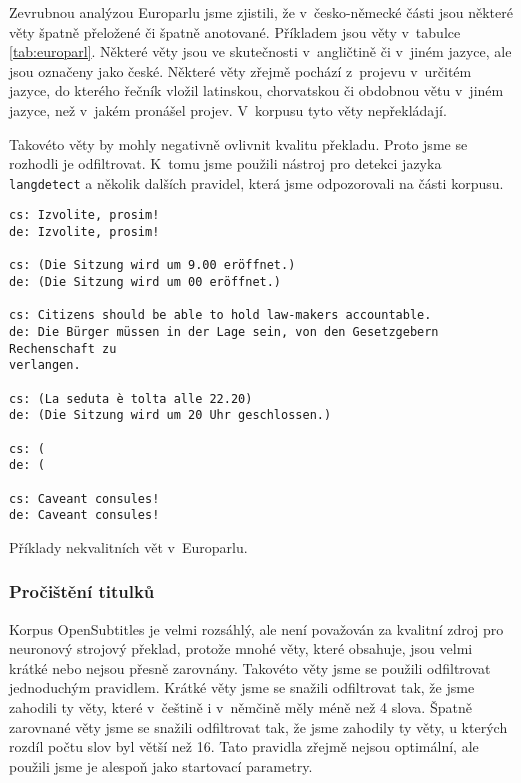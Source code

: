 \documentclass[a4]{article}
\begin{document}
Zevrubnou analýzou Europarlu jsme zjistili, že v~česko-německé části jsou některé
věty špatně přeložené či špatně anotované. Příkladem jsou věty v~tabulce
\ref{tab:europarl}. Některé věty jsou ve skutečnosti v~angličtině či v~jiném
jazyce, ale jsou označeny jako české. Některé věty zřejmě pochází
z~projevu v~určitém jazyce, do kterého řečník vložil latinskou, chorvatskou
či obdobnou větu v~jiném jazyce, než v~jakém pronášel projev. V~korpusu
tyto věty nepřekládají. 

Takovéto věty by mohly negativně ovlivnit kvalitu překladu. Proto jsme se
rozhodli je odfiltrovat. K~tomu jsme použili
nástroj pro detekci jazyka {\tt langdetect}\cite{langdetect} a několik
dalších pravidel, která jsme odpozorovali na části korpusu.

\begin{table}[ht]
\begin{verbatim}
cs: Izvolite, prosim!
de: Izvolite, prosim!

cs: (Die Sitzung wird um 9.00 eröffnet.)
de: (Die Sitzung wird um 00 eröffnet.)

cs: Citizens should be able to hold law-makers accountable.
de: Die Bürger müssen in der Lage sein, von den Gesetzgebern Rechenschaft zu
verlangen.

cs: (La seduta è tolta alle 22.20)
de: (Die Sitzung wird um 20 Uhr geschlossen.)

cs: (
de: (

cs: Caveant consules!
de: Caveant consules!
\end{verbatim}
\caption{Příklady nekvalitních vět v~Europarlu.}
\label{tab:europarl}
\end{table}

\subsubsection{Pročištění titulků}

Korpus OpenSubtitles je velmi rozsáhlý, ale není považován za kvalitní
zdroj pro neuronový strojový překlad, protože mnohé věty, které obsahuje,
jsou velmi krátké nebo nejsou přesně zarovnány. Takovéto věty jsme se
použili odfiltrovat jednoduchým pravidlem. Krátké věty jsme se snažili
odfiltrovat tak, že jsme zahodili ty věty, které v~češtině i v~němčině měly
méně než 4 slova. Špatně zarovnané věty jsme se snažili odfiltrovat tak, že
jsme zahodily ty věty, u kterých rozdíl počtu slov byl větší než 16. Tato
pravidla zřejmě nejsou optimální, ale použili jsme je alespoň jako
startovací parametry.
\end{document}
